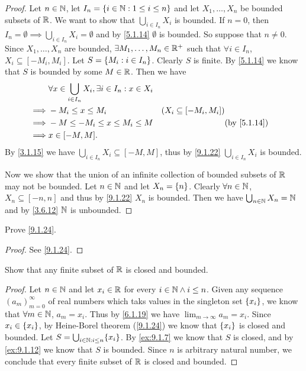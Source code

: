 \begin{proof}
  Let \(n \in \mathbb{N}\), let \(I_n = \left\lbrace i \in \mathbb{N} : 1 \leq i \leq n\right\rbrace\) and let \(X_1, \dots, X_n\) be bounded subsets of \(\mathbb{R}\).
  We want to show that \(\bigcup_{i \in I_n} X_i\) is bounded.
  If \(n = 0\), then \(I_n = \emptyset \implies \bigcup_{i \in I_n} X_i = \emptyset\) and by \cref{5.1.14} \(\emptyset\) is bounded.
  So suppose that \(n \neq 0\).
  Since \(X_1, \dots, X_n\) are bounded, \(\exists M_1, \dots, M_n \in \mathbb{R}^+\) such that \(\forall i \in I_n\), \(X_i \subseteq [-M_i, M_i]\).
  Let \(S = \left\lbrace M_i : i \in I_n\right\rbrace\).
  Clearly \(S\) is finite.
  By \cref{5.1.14} we know that \(S\) is bounded by some \(M \in \mathbb{R}\).
  Then we have
  \begin{align*}
             & \forall x \in \bigcup_{i \in I_n} X_i, \exists i \in I_n : x \in X_i                                             \\
    \implies & -M_i \leq x \leq M_i                                                 & (X_i \subseteq [-M_i, M_i])               \\
    \implies & -M \leq -M_i \leq x \leq M_i \leq M                                  &                             & \by{5.1.14} \\
    \implies & x \in [-M, M].
  \end{align*}
  By \cref{3.1.15} we have \(\bigcup_{i \in I_n} X_i \subseteq [-M, M]\), thus by \cref{9.1.22} \(\bigcup_{i \in I_n} X_i\) is bounded.

  Now we show that the union of an infinite collection of bounded subsets of \(\mathbb{R}\) may not be bounded.
  Let \(n \in \mathbb{N}\) and let \(X_n = \left\lbrace n\right\rbrace\).
  Clearly \(\forall n \in \mathbb{N}\), \(X_n \subseteq [-n, n]\) and thus by \cref{9.1.22} \(X_n\) is bounded.
  Then we have \(\bigcup_{n \in \mathbb{N}} X_n = \mathbb{N}\) and by \cref{3.6.12} \(\mathbb{N}\) is unbounded.
\end{proof}

\begin{ex}\label{ex:9.1.13}
  Prove \cref{9.1.24}.
\end{ex}

\begin{proof}
  See \cref{9.1.24}.
\end{proof}

\begin{ex}\label{ex:9.1.14}
  Show that any finite subset of \(\mathbb{R}\) is closed and bounded.
\end{ex}

\begin{proof}
  Let \(n \in \mathbb{N}\) and let \(x_i \in \mathbb{R}\) for every \(i \in \mathbb{N} \land i \leq n\).
  Given any sequence \((a_m)_{m = 0}^\infty\) of real numbers which taks values in the singleton set \(\left\lbrace x_i\right\rbrace\), we know that \(\forall m \in \mathbb{N}\), \(a_m = x_i\).
  Thus by \cref{6.1.19} we have \(\lim_{m \to \infty} a_m = x_i\).
  Since \(x_i \in \left\lbrace x_i\right\rbrace\), by Heine-Borel theorem (\cref{9.1.24}) we know that \(\left\lbrace x_i\right\rbrace\) is closed and bounded.
  Let \(S = \bigcup_{i \in \N : i \leq n} \set{x_i}\).
  By \cref{ex:9.1.7} we know that \(S\) is closed, and by \cref{ex:9.1.12} we know that \(S\) is bounded.
  Since \(n\) is arbitrary natural number, we conclude that every finite subset of \(\mathbb{R}\) is closed and bounded.
\end{proof}

